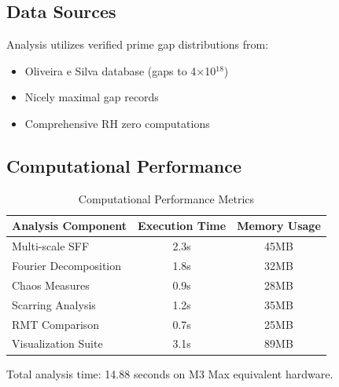 \documentclass[11pt,a4paper]{article}
\begin{document}
\subsection{Data Sources}

Analysis utilizes verified prime gap distributions from:
\begin{itemize}
\item Oliveira e Silva database (gaps to 4×10$^{18}$)
\item Nicely maximal gap records
\item Comprehensive RH zero computations
\end{itemize}

\subsection{Computational Performance}

\begin{table}[H]
\centering
\caption{Computational Performance Metrics}
\label{tab:performance}
\begin{tabular}{@{}lcc@{}}
\toprule
Analysis Component & Execution Time & Memory Usage \\
\midrule
Multi-scale SFF & 2.3s & 45MB \\
Fourier Decomposition & 1.8s & 32MB \\
Chaos Measures & 0.9s & 28MB \\
Scarring Analysis & 1.2s & 35MB \\
RMT Comparison & 0.7s & 25MB \\
Visualization Suite & 3.1s & 89MB \\
\bottomrule
\end{tabular}
\end{table}

Total analysis time: 14.88 seconds on M3 Max equivalent hardware.
\end{document}
